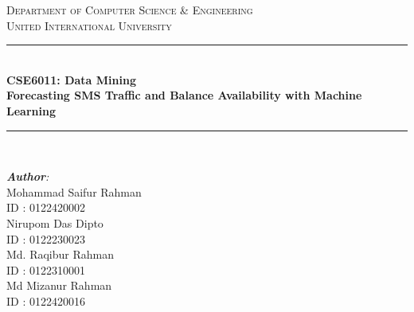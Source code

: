 \documentclass[12pt]{book} %
\begin{document}
\begin{titlepage}

\newcommand{\HRule}{\rule{\linewidth}{0.5mm}} %
\center %
 

\textsc{\Large Department of Computer Science \& Engineering}\\[0.5cm] %
\textsc{\Huge United International University}\\[1cm] %


\HRule \\[0.4cm]
{ \huge \LARGE \textbf{CSE6011: Data Mining}}\\ [0.4cm] %
{ {\Large \textbf{Forecasting SMS Traffic and Balance Availability with Machine Learning}}}\\
\HRule \\ [1cm]


\begin{minipage}{0.5\textwidth}
\begin{flushleft} \small
\emph{\textbf{\large Author}:}\\
Mohammad Saifur Rahman  \\ %
ID : 0122420002\\
Nirupom Das Dipto  \\ %
ID : 0122230023\\
Md. Raqibur Rahman  \\ %
ID : 0122310001\\
Md Mizanur Rahman \\ %
ID : 0122420016\\


\end{flushleft}
\end{minipage}
\end{titlepage}
\end{document}
